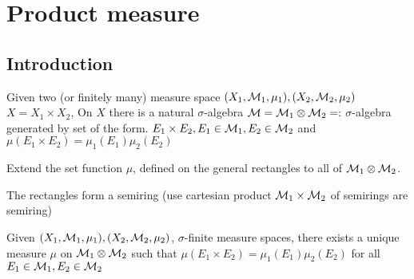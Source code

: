 \chapter{Product measure}
\section{Introduction}

Given two (or finitely many) measure space $(X_1, \mathcal M_1, \mu_1),(X_2, \mathcal M_2, \mu_2)$
$X = X_1 \times X_2$, On $X$ there is a natural $\sigma$-algebra $\mathcal M = \mathcal M_1 \otimes \mathcal M_2 =:$ $\sigma$-algebra generated by set of the form.
$E_1 \times E_2, E_1 \in \mathcal M_1, E_2 \in \mathcal M_2$ and 
$\mu(E_1 \times E_2) = \mu_1(E_1) \mu_2(E_2)$


Extend the set function $\mu$, defined on the general rectangles to all of $\mathcal M_1 \otimes \mathcal M_2$.

\begin{claim}
  The rectangles form a semiring (use cartesian product $\mathcal M_1 \times \mathcal M_2$ of semirings are semiring)
\end{claim}

\begin{theorem}
  Given $(X_1, \mathcal M_1, \mu_1), (X_2, \mathcal M_2, \mu_2)$, $\sigma$-finite measure spaces, there exists a unique measure $\mu$ on $\mathcal M_1 \otimes \mathcal M_2$ such that $\mu(E_1 \times E_2) = \mu_1(E_1) \mu_2(E_2)$ for all $E_1 \in \mathcal M_1, E_2 \in \mathcal M_2$
\end{theorem}

